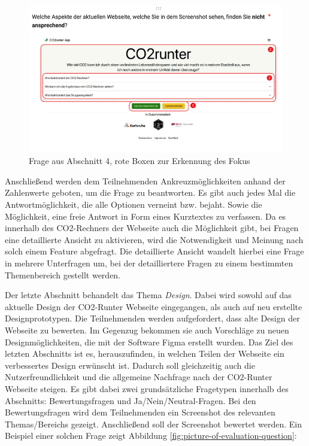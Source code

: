 \begin{figure}[H]
    \centering
    \includegraphics[width=1\textwidth]{images/05/picture_of_screenshot_with_boxes}
    \caption{Frage aus Abschnitt 4, rote Boxen zur Erkennung des Fokus}
    \label{fig:picture-of-screenshot-with-boxes}
\end{figure}

Anschließend werden dem Teilnehmenden Ankreuzmöglichkeiten anhand der Zahlenwerte geboten, um die Frage zu beantworten.
Es gibt auch jedes Mal die Antwortmöglichkeit, die alle Optionen verneint bzw. bejaht.
Sowie die Möglichkeit, eine freie Antwort in Form eines Kurztextes zu verfassen.
Da es innerhalb des CO2-Rechners der Webseite auch die Möglichkeit gibt, bei Fragen eine detaillierte Ansicht zu aktivieren, wird die Notwendigkeit und Meinung nach solch einem Feature abgefragt.
Die detaillierte Ansicht wandelt hierbei eine Frage in mehrere Unterfragen um, bei der detailliertere Fragen zu einem bestimmten Themenbereich gestellt werden.\

Der letzte Abschnitt behandelt das Thema \textit{Design}.
Dabei wird sowohl auf das aktuelle Design der CO2-Runter Webseite eingegangen, als auch auf neu erstellte Designprototypen.
Die Teilnehmenden werden aufgefordert, dass alte Design der Webseite zu bewerten.
Im Gegenzug bekommen sie auch Vorschläge zu neuen Designmöglichkeiten, die mit der Software Figma erstellt wurden.
Das Ziel des letzten Abschnitts ist es, herauszufinden, in welchen Teilen der Webseite ein verbessertes Design erwünscht ist.
Dadurch soll gleichzeitig auch die Nutzerfreundlichkeit und die allgemeine Nachfrage nach der CO2-Runter Webseite steigen.
Es gibt dabei zwei grundsätzliche Fragetypen innerhalb des Abschnitts: Bewertungsfragen und Ja/Nein/Neutral-Fragen.
Bei den Bewertungsfragen wird dem Teilnehmenden ein Screenshot des relevanten Themas/Bereichs gezeigt.
Anschließend soll der Screenshot bewertet werden.
Ein Beispiel einer solchen Frage zeigt Abbildung \ref{fig:picture-of-evaluation-question}:


